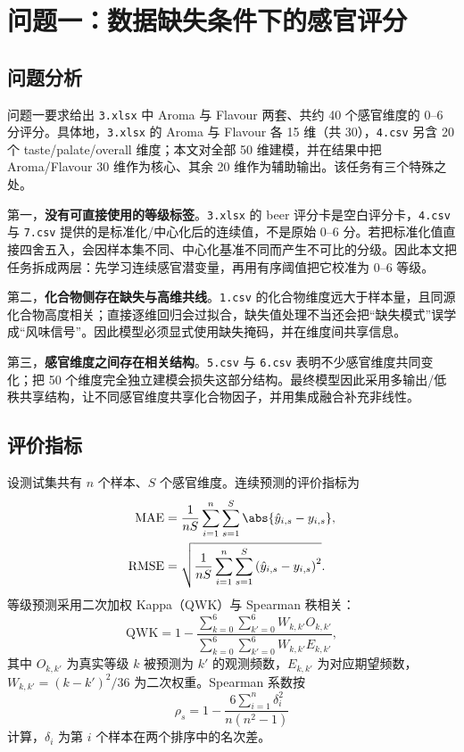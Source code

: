 
\section{问题一：数据缺失条件下的感官评分}
\label{sec:q1}

\subsection{问题分析}

问题一要求给出 \texttt{3.xlsx} 中 Aroma 与 Flavour 两套、共约 40 个感官维度的 0--6 分评分。具体地，\texttt{3.xlsx} 的 Aroma 与 Flavour 各 15 维（共 30），\texttt{4.csv} 另含 20 个 taste/palate/overall 维度；本文对全部 50 维建模，并在结果中把 Aroma/Flavour 30 维作为核心、其余 20 维作为辅助输出。该任务有三个特殊之处。

第一，\textbf{没有可直接使用的等级标签}。\texttt{3.xlsx} 的 beer 评分卡是空白评分卡，\texttt{4.csv} 与 \texttt{7.csv} 提供的是标准化/中心化后的连续值，不是原始 0--6 分。若把标准化值直接四舍五入，会因样本集不同、中心化基准不同而产生不可比的分级。因此本文把任务拆成两层：先学习连续感官潜变量，再用有序阈值把它校准为 0--6 等级。

第二，\textbf{化合物侧存在缺失与高维共线}。\texttt{1.csv} 的化合物维度远大于样本量，且同源化合物高度相关；直接逐维回归会过拟合，缺失值处理不当还会把“缺失模式”误学成“风味信号”。因此模型必须显式使用缺失掩码，并在维度间共享信息。

第三，\textbf{感官维度之间存在相关结构}。\texttt{5.csv} 与 \texttt{6.csv} 表明不少感官维度共同变化；把 50 个维度完全独立建模会损失这部分结构。最终模型因此采用多输出/低秩共享结构，让不同感官维度共享化合物因子，并用集成融合补充非线性。

\subsection{评价指标}

设测试集共有 $n$ 个样本、$S$ 个感官维度。连续预测的评价指标为
\begin{align}
  \mathrm{MAE} &= \frac{1}{nS}\sum_{i=1}^{n}\sum_{s=1}^{S}\abs{\hat{y}_{i,s}-y_{i,s}},
  \label{eq:mae}\\
  \mathrm{RMSE} &= \sqrt{\frac{1}{nS}\sum_{i=1}^{n}\sum_{s=1}^{S}\left(\hat{y}_{i,s}-y_{i,s}\right)^2}.
  \label{eq:rmse}
\end{align}
等级预测采用二次加权 Kappa（QWK）与 Spearman 秩相关：
\begin{equation}
  \mathrm{QWK}=1-\frac{\sum_{k=0}^{6}\sum_{k'=0}^{6}W_{k,k'}O_{k,k'}}
  {\sum_{k=0}^{6}\sum_{k'=0}^{6}W_{k,k'}E_{k,k'}},
  \label{eq:qwk}
\end{equation}
其中 $O_{k,k'}$ 为真实等级 $k$ 被预测为 $k'$ 的观测频数，$E_{k,k'}$ 为对应期望频数，$W_{k,k'}=(k-k')^2/36$ 为二次权重\citep{cohen1968weighted}。Spearman 系数按
\begin{equation}
  \rho_s=1-\frac{6\sum_{i=1}^{n}\delta_i^2}{n(n^2-1)}
  \label{eq:spearman}
\end{equation}
计算，$\delta_i$ 为第 $i$ 个样本在两个排序中的名次差\citep{spearman1904proof}。

